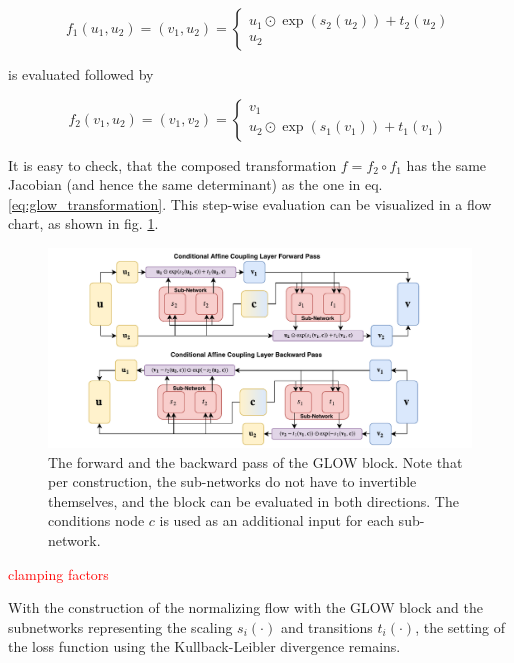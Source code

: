\begin{equation*}
	f_1(u_1, u_2) = (v_1, u_2) = \begin{cases}
		u_1 \odot \exp(s_2(u_2)) + t_2(u_2) \\
		u_2
	\end{cases}
\end{equation*}

is evaluated followed by

\begin{equation*}
	f_2(v_1, u_2) = (v_1, v_2) = \begin{cases}
		v_1 \\
		 u_2 \odot \exp(s_1(v_1)) + t_1(v_1)
	\end{cases}
\end{equation*}

It is easy to check, that the composed transformation $f = f_2 \circ f_1$ has the same Jacobian (and hence the same determinant) as the one in eq. \ref{eq:glow_transformation}. This step-wise evaluation can be visualized in a flow chart, as shown in fig. \ref{fig:glow}.

\begin{figure}
	\centering
	\includegraphics[width=\linewidth]{figures/neural_networks/glow.pdf}
	\caption{The forward and the backward pass of the GLOW block. Note that per construction, the sub-networks do not have to invertible themselves, and the block can be evaluated in both directions. The conditions node $c$ is used as an additional input for each sub-network. \cite{Ksoll_2020}}
	\label{fig:glow}
\end{figure}

\textcolor{red}{clamping factors}

With the construction of the normalizing flow with the GLOW block and the subnetworks representing the scaling $s_i(\cdot)$ and transitions $t_i(\cdot)$, the setting of the loss function using the Kullback-Leibler divergence remains.

